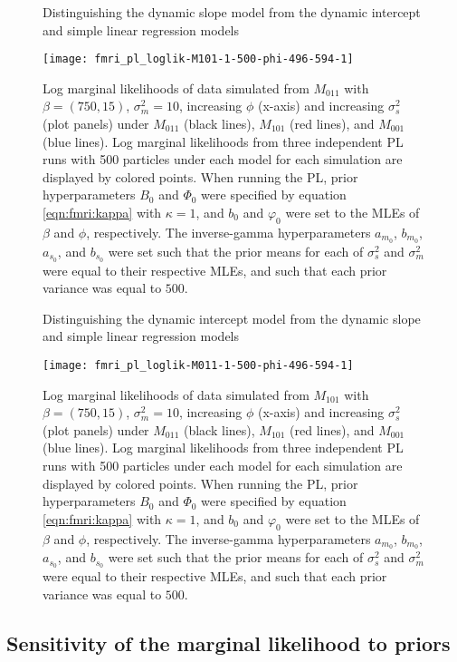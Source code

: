 \begin{figure}
\ssp
\centering
\caption{Distinguishing the dynamic slope model from the dynamic intercept and simple linear regression models} \label{fig:fmri:phi:M011}
\texttt{[image: fmri\_pl\_loglik-M101-1-500-phi-496-594-1]}
\caption*{Log marginal likelihoods of data simulated from $M_{011}$ with $\beta=(750,15)$, $\sigma^2_m = 10$, increasing $\phi$ (x-axis) and increasing $\sigma^2_s$ (plot panels) under $M_{011}$ (black lines), $M_{101}$ (red lines), and $M_{001}$ (blue lines). Log marginal likelihoods from three independent PL runs with 500 particles under each model for each simulation are displayed by colored points. When running the PL, prior hyperparameters $B_0$ and $\Phi_0$ were specified by equation \eqref{eqn:fmri:kappa} with $\kappa = 1$, and $b_0$ and $\varphi_0$ were set to the MLEs of $\beta$ and $\phi$, respectively. The inverse-gamma hyperparameters $a_{m_0}$, $b_{m_0}$, $a_{s_0}$, and $b_{s_0}$ were set such that the prior means for each of $\sigma^2_s$ and $\sigma^2_m$ were equal to their respective MLEs, and such that each prior variance was equal to $500$.}
\end{figure}

\begin{figure}
\ssp
\centering
\caption{Distinguishing the dynamic intercept model from the dynamic slope and simple linear regression models} \label{fig:fmri:phi:M101}
\texttt{[image: fmri\_pl\_loglik-M011-1-500-phi-496-594-1]}
\caption*{Log marginal likelihoods of data simulated from $M_{101}$ with $\beta=(750,15)$, $\sigma^2_m = 10$, increasing $\phi$ (x-axis) and increasing $\sigma^2_s$ (plot panels) under $M_{011}$ (black lines), $M_{101}$ (red lines), and $M_{001}$ (blue lines). Log marginal likelihoods from three independent PL runs with 500 particles under each model for each simulation are displayed by colored points. When running the PL, prior hyperparameters $B_0$ and $\Phi_0$ were specified by equation \eqref{eqn:fmri:kappa} with $\kappa = 1$, and $b_0$ and $\varphi_0$ were set to the MLEs of $\beta$ and $\phi$, respectively. The inverse-gamma hyperparameters $a_{m_0}$, $b_{m_0}$, $a_{s_0}$, and $b_{s_0}$ were set such that the prior means for each of $\sigma^2_s$ and $\sigma^2_m$ were equal to their respective MLEs, and such that each prior variance was equal to $500$.}
\end{figure}

\subsection{Sensitivity of the marginal likelihood to priors \label{sec:fmri:kappa}}


